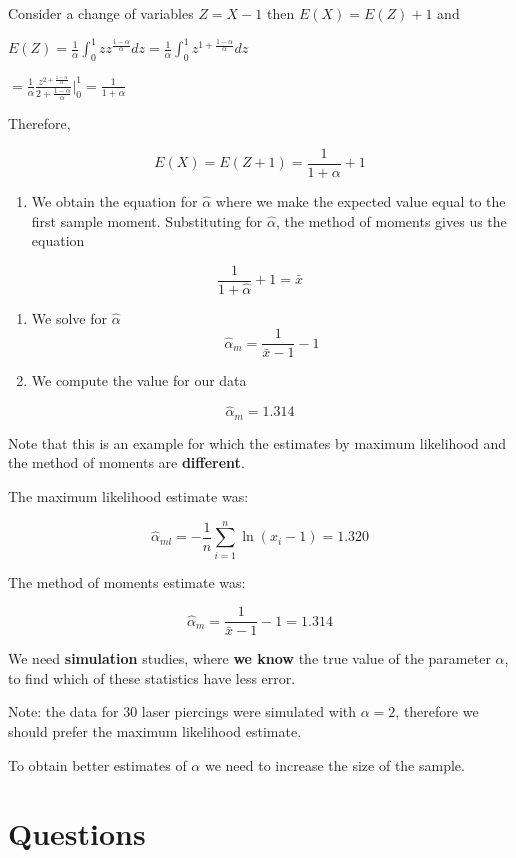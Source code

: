 \documentclass[
]{book}
\providecommand{\tightlist}{%
  \setlength{\itemsep}{0pt}\setlength{\parskip}{0pt}}
\begin{document}
Consider a change of variables \(Z=X-1\) then \(E(X)=E(Z)+1\) and

\(E(Z)= \frac{1}{\alpha} \int_0^1 z z^{\frac{1-\alpha}{\alpha}}dz= \frac{1}{\alpha} \int_0^1 z^{1+\frac{1-\alpha}{\alpha}}dz\)

\(= \frac{1}{\alpha} \frac{z^{2+\frac{1-\alpha}{\alpha}}}{{2+\frac{1-\alpha}{\alpha}}} |_0^1=\frac{1}{1+\alpha}\)

Therefore,

\[E(X)=E(Z+1)=\frac{1}{1+\alpha}+1\]

\begin{enumerate}
\def\labelenumi{\arabic{enumi}.}
\setcounter{enumi}{1}
\tightlist
\item
  We obtain the equation for \(\hat{\alpha}\) where we make the expected value equal to the first sample moment. Substituting for \(\hat{\alpha}\), the method of moments gives us the equation
\end{enumerate}

\[\frac{1}{1+\hat{\alpha}}+1=\bar{x}\]

\begin{enumerate}
\def\labelenumi{\arabic{enumi}.}
\setcounter{enumi}{2}
\item
  We solve for \(\hat{\alpha}\) \[\hat{\alpha}_m=\frac{1}{\bar{x}-1}-1\]
\item
  We compute the value for our data
\end{enumerate}

\[\hat{\alpha}_m=1.314\]

Note that this is an example for which the estimates by maximum likelihood and the method of moments are \textbf{different}.

The maximum likelihood estimate was:

\[\hat{\alpha}_{ml}=-\frac{1}{n}\sum_{i=1}^n \ln (x_i-1)=1.320\]

The method of moments estimate was:

\[\hat{\alpha}_m=\frac{1}{\bar{x}-1}-1=1.314\]

We need \textbf{simulation} studies, where \textbf{we know} the true value of the parameter \(\alpha\), to find which of these statistics have less error.

Note: the data for \(30\) laser piercings were simulated with \(\alpha=2\), therefore we should prefer the maximum likelihood estimate.

To obtain better estimates of \(\alpha\) we need to increase the size of the sample.

\hypertarget{questions-9}{%
\section{Questions}\label{questions-9}}
\end{document}
